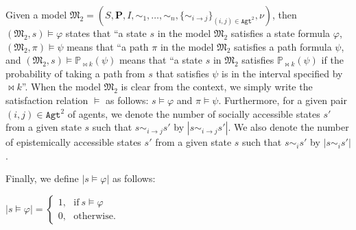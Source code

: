 Given a model $\mathfrak{M_2}=(S,\textbf{P},I,\sim_1, \ldots
,\sim_n,\{\sim_{i \rightarrow j}\}_{{(i,j)}\in \texttt{Agt}^2},\nu)$, then $(\mathfrak{M_2},s) \models \varphi$ states that ``a state $s$ in the model $\mathfrak{M_2}$ satisfies a state formula $\varphi$, $(\mathfrak{M_2},\pi) \models \psi$ means that ``a path $\pi$ in the model $\mathfrak{M_2}$ satisfies a path formula $\psi$, and
$(\mathfrak{M_2},s) \models \mathbb{P}_{\bowtie k}(\psi)$ means that
``a state $s$ in $\mathfrak{M_2}$ satisfies $\mathbb{P}_{\bowtie k}(\psi)$ if the probability of taking a path from $s$ that satisfies $\psi$ is in the interval specified by $\bowtie k$''. When the model $\mathfrak{M_2}$ is clear from the context, we simply write the satisfaction relation $\models$ as follows: $s \models \varphi$ and $\pi \models \psi$. Furthermore,
for a given pair $(i,j)\in \texttt{Agt}^2$ of agents, we denote
the number of socially accessible states $s'$ from a given state $s$ such
that $s\sim_{i\rightarrow j}s'$ by $|s\sim_{i\rightarrow j}s'|$.
We also denote the number of epistemically accessible states $s'$ from a given state $s$ such that $s\sim_i s'$ by $|s\sim_i s'|$.

Finally, we define $|s\models \varphi|$ as follows:

\begin{center}
$|s\models \varphi|=
\begin{cases}
1,~~~\textrm{if}~ s\models\varphi\\
0,~~~\textrm{otherwise.}
\end{cases}$
\end{center}

